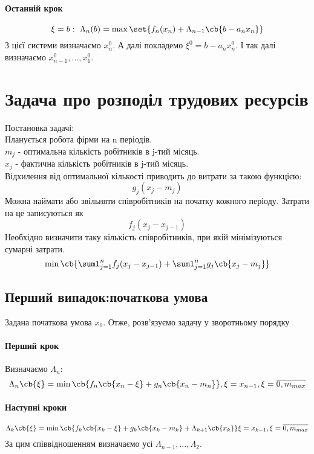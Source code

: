 \paragraph{Останній крок}
\begin{equation}
	\xi=b:~\Lambda_n(b) = \max \set{f_n(x_n)+\Lambda_{n-1}\cb{b-a_nx_n}}
\end{equation}
З цієї системи визначаємо $x_n^0$. А далі покладемо $\xi^0=b-a_nx_n^0$. І так далі визначаємо $x_{n-1}^0,\ldots,x_1^0$.
\section{Задача про розподіл трудових ресурсів}
Постановка задачі:\\
Планується робота фірми на n періодів. \\
$m_j$ - оптимальна кількість робітників в j-тий місяць.\\
$x_j$ - фактична кількість робітників в j-тий місяць.\\
Відхилення від оптимальної кількості приводить до витрати за такою функцією:
\begin{equation}
	g_j(x_j-m_j)
\end{equation}
Можна наймати або звільняти співробітників на початку кожного періоду. Затрати на це записуються як
\begin{equation}
	f_j(x_j-x_{j-1})
\end{equation}
Необхідно визначити таку кількість співробітників, при якій мінімізуються сумарні затрати.
\begin{equation}
	\min\cb{\suml_{j=1}^n f_j(x_j-x_{j-1}) + \suml_{j=1}^n g_j \cb{x_j-m_j}}
\end{equation}
\subsection{Перший випадок:початкова умова}
Задана початкова умова $x_0$. Отже, розв’язуємо задачу у зворотньому порядку
\paragraph{Перший крок}
Визначаємо $\Lambda_n$:
\begin{equation}
	\Lambda_n\cb{\xi} = \min\cb{f_n\cb{x_n-\xi} + g_n\cb{x_n-m_n}},\xi = x_{n-1},\xi=\overline{0,m_{max}}
\end{equation}
\paragraph{Наступні кроки}
\begin{equation}
	\Lambda_k\cb{\xi} = \min \cb{ f_k\cb{x_k - \xi} + g_k \cb{x_k-m_k} + \Lambda_{k+1} \cb{x_k}}  \xi = x_{k-1},\xi=\overline{0,m_{max}}
\end{equation}
За цим співвідношенням визначаємо усі $\Lambda_{n-1},\ldots,\Lambda_2$.
